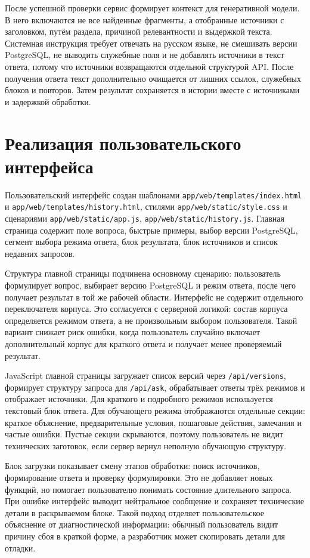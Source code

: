 После успешной проверки сервис формирует контекст для генеративной модели. В него включаются не все найденные фрагменты, а отобранные источники с заголовком, путём раздела, причиной релевантности и выдержкой текста. Системная инструкция требует отвечать на русском языке, не смешивать версии PostgreSQL, не выводить служебные поля и не добавлять источники в текст ответа, потому что источники возвращаются отдельной структурой API. После получения ответа текст дополнительно очищается от лишних ссылок, служебных блоков и повторов. Затем результат сохраняется в истории вместе с источниками и задержкой обработки.

\section{Реализация пользовательского интерфейса}

Пользовательский интерфейс создан шаблонами \texttt{app/web/templates/index.html} и \texttt{app/web/templates/history.html}, стилями \texttt{app/web/static/style.css} и сценариями \texttt{app/web/static/app.js}, \texttt{app/web/static/history.js}. Главная страница содержит поле вопроса, быстрые примеры, выбор версии PostgreSQL, сегмент выбора режима ответа, блок результата, блок источников и список недавних запросов.

Структура главной страницы подчинена основному сценарию: пользователь формулирует вопрос, выбирает версию PostgreSQL и режим ответа, после чего получает результат в той же рабочей области. Интерфейс не содержит отдельного переключателя корпуса. Это согласуется с серверной логикой: состав корпуса определяется режимом ответа, а не произвольным выбором пользователя. Такой вариант снижает риск ошибки, когда пользователь случайно включает дополнительный корпус для краткого ответа и получает менее проверяемый результат.

JavaScript главной страницы загружает список версий через \texttt{/api/versions}, формирует структуру запроса для \texttt{/api/ask}, обрабатывает ответы трёх режимов и отображает источники. Для краткого и подробного режимов используется текстовый блок ответа. Для обучающего режима отображаются отдельные секции: краткое объяснение, предварительные условия, пошаговые действия, замечания и частые ошибки. Пустые секции скрываются, поэтому пользователь не видит технических заготовок, если сервер вернул неполную обучающую структуру.

Блок загрузки показывает смену этапов обработки: поиск источников, формирование ответа и проверку формулировки. Это не добавляет новых функций, но помогает пользователю понимать состояние длительного запроса. При ошибке интерфейс выводит нейтральное сообщение и сохраняет технические детали в раскрываемом блоке. Такой подход отделяет пользовательское объяснение от диагностической информации: обычный пользователь видит причину сбоя в краткой форме, а разработчик может скопировать детали для отладки.

